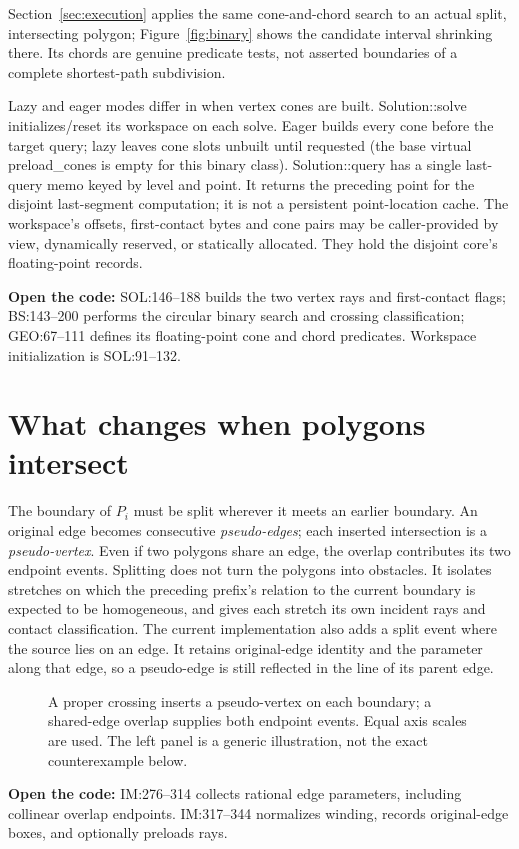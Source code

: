 \documentclass[12pt,a4paper]{article}
\newcommand{\code}[1]{{\ttfamily\color{codekw}#1}}
\begin{document}
Section~\ref{sec:execution} applies the same cone-and-chord search to an actual split, intersecting polygon; Figure~\ref{fig:binary} shows the candidate interval shrinking there. Its chords are genuine predicate tests, not asserted boundaries of a complete shortest-path subdivision.

Lazy and eager modes differ in when vertex cones are built. \code{Solution::solve} initializes/reset its workspace on each solve. Eager builds every cone before the target query; lazy leaves cone slots unbuilt until requested (the base virtual \code{preload\_cones} is empty for this binary class). \code{Solution::query} has a single last-query memo keyed by level and point. It returns the preceding point for the disjoint last-segment computation; it is not a persistent point-location cache. The workspace's offsets, first-contact bytes and cone pairs may be caller-provided by view, dynamically reserved, or statically allocated. They hold the disjoint core's floating-point records.
\begin{sourcebox}
\textbf{Open the code:} \code{SOL:146--188} builds the two vertex rays and first-contact flags; \code{BS:143--200} performs the circular binary search and crossing classification; \code{GEO:67--111} defines its floating-point cone and chord predicates. Workspace initialization is \code{SOL:91--132}.
\end{sourcebox}

\section{What changes when polygons intersect}
The boundary of \(P_i\) must be split wherever it meets an earlier boundary. An original edge becomes consecutive \emph{pseudo-edges}; each inserted intersection is a \emph{pseudo-vertex}. Even if two polygons share an edge, the overlap contributes its two endpoint events. Splitting does not turn the polygons into obstacles. It isolates stretches on which the preceding prefix's relation to the current boundary is expected to be homogeneous, and gives each stretch its own incident rays and contact classification. The current implementation also adds a split event where the source lies on an edge. It retains original-edge identity and the parameter along that edge, so a pseudo-edge is still reflected in the line of its parent edge.

\begin{figure}[h]\centering\figsplit\caption{A proper crossing inserts a pseudo-vertex on each boundary; a shared-edge overlap supplies both endpoint events. Equal axis scales are used. The left panel is a generic illustration, not the exact counterexample below.}\label{fig:split}\end{figure}
\begin{sourcebox}
\textbf{Open the code:} \code{IM:276--314} collects rational edge parameters, including collinear overlap endpoints. \code{IM:317--344} normalizes winding, records original-edge boxes, and optionally preloads rays.
\end{sourcebox}
\end{document}
